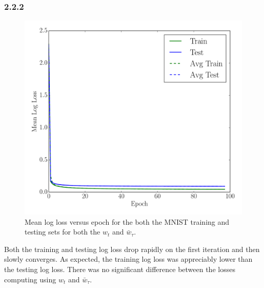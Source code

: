 \documentclass[12pt]{amsart}
\begin{document}
\subsubsection*{2.2.2}
\begin{figure}[H]
	\includegraphics[width=\columnwidth]{logistic_log_loss.pdf}
    \caption{Mean log loss versus epoch for the both the MNIST training and testing sets for both the $w_t$ and $\bar{w}_{\tau}$.}
    \label{fig:logistic_log_loss}
\end{figure}
Both the training and testing log loss drop rapidly on the first iteration and then slowly converges.  As expected, the training log loss was appreciably lower than the testing log loss.  There was no significant difference between the losses computing using $w_t$ and $\bar{w}_{\tau}$.
\end{document}
